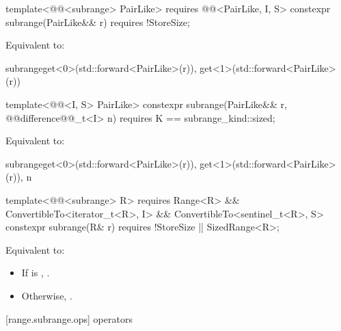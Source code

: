 %
\begin{itemdecl}
template<@@<subrange> PairLike>
  requires @@<PairLike, I, S>
constexpr subrange(PairLike&& r) requires !StoreSize;
\end{itemdecl}

\begin{itemdescr}
\pnum
\effects Equivalent to:
\begin{codeblock}
subrange{get<0>(std::forward<PairLike>(r)), get<1>(std::forward<PairLike>(r))}
\end{codeblock}
\end{itemdescr}

%
\begin{itemdecl}
template<@@<I, S> PairLike>
constexpr subrange(PairLike&& r, @@difference@@_t<I> n)
  requires K == subrange_kind::sized;
\end{itemdecl}

\begin{itemdescr}
\pnum
\effects Equivalent to:
\begin{codeblock}
subrange{get<0>(std::forward<PairLike>(r)), get<1>(std::forward<PairLike>(r)), n}
\end{codeblock}
\end{itemdescr}

{\color{oldclr}
%
\begin{itemdecl}
template<@@<subrange> R>
  requires Range<R> && ConvertibleTo<iterator_t<R>, I> && ConvertibleTo<sentinel_t<R>, S>
constexpr subrange(R& r) requires !StoreSize || SizedRange<R>;
\end{itemdecl}

\begin{itemdescr}
\pnum
\effects Equivalent to:
\begin{itemize}
\item If  is ,
.
\item Otherwise,
.
\end{itemize}
\end{itemdescr}
} %

[range.subrange.ops]{ operators}

